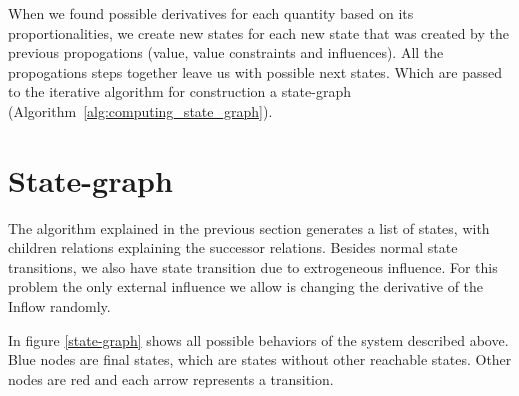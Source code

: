 \documentclass[a4paper]{article}
\begin{document}
When we found possible derivatives for each quantity based on its proportionalities, we create new states for each new state that was created by the previous propogations (value, value constraints and influences). All the propogations steps together leave us with possible next states. Which are passed to the iterative algorithm for construction a state-graph (Algorithm~\ref{alg:computing_state_graph}).

\section{State-graph}
The algorithm explained in the previous section generates a list of states, with children relations explaining the successor relations. Besides normal state transitions, we also have state transition due to extrogeneous influence. For this problem the only external influence we allow is changing the derivative of the Inflow randomly.

In figure \ref{state-graph} shows all possible behaviors of the system described above. Blue nodes are final states, which are states without other reachable states. Other nodes are red and each arrow represents a transition.
\end{document}
